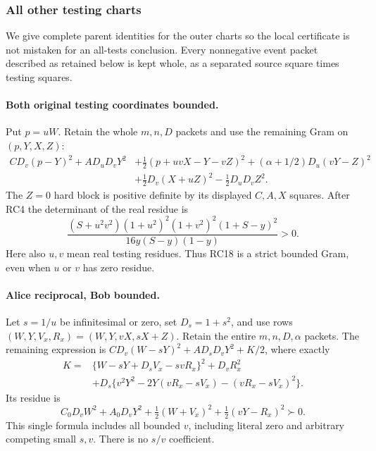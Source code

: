 \subsubsection*{All other testing charts}

We give complete parent identities for the outer charts so the
local certificate is not mistaken for an all-tests conclusion.
Every nonnegative event packet described as retained below is
kept whole, as a separated source square times testing squares.

\paragraph{Both original testing coordinates bounded.}
Put $p=uW$. Retain the whole $m,n,D$ packets and use the
remaining Gram on $(p,Y,X,Z)$:
\[
\begin{split}
 C D_v(p-Y)^2+A D_uD_vY^2
 &+\tfrac12(p+uvX-Y-vZ)^2+(\alpha+1/2)D_u(vY-Z)^2\\
 &+\tfrac12D_v(X+uZ)^2-\tfrac12D_uD_vZ^2.
\end{split}\tag{RC18}
\]
The $Z=0$ hard block is positive definite by its displayed
$C,A,X$ squares. After RC4 the determinant of the real residue is
\[
 \frac{(S+u^2v^2)(1+u^2)^2(1+v^2)^2(1+S-y)^2}
      {16y(S-y)(1-y)}>0.
 \tag{RC19}
\]
Here also $u,v$ mean real testing residues. Thus RC18 is a strict
bounded Gram, even when $u$ or $v$ has zero residue.

\paragraph{Alice reciprocal, Bob bounded.}
Let $s=1/u$ be infinitesimal or zero, set $D_s=1+s^2$, and use
rows $(W,Y,V_x,R_x)=(W,Y,vX,sX+Z)$. Retain the entire
$m,n,D,\alpha$ packets. The remaining expression is
$CD_v(W-sY)^2+AD_sD_vY^2+K/2$, where exactly
\[
\begin{split}
 K={}&\{W-sY+D_sV_x-svR_x\}^2+D_vR_x^2\\
 &+D_s\{v^2Y^2-2Y(vR_x-sV_x)-(vR_x-sV_x)^2\}.
\end{split}\tag{RC20}
\]
Its residue is
\[
 C_0D_vW^2+A_0D_vY^2
          +\tfrac12(W+V_x)^2+\tfrac12(vY-R_x)^2\succ0.
 \tag{RC21}
\]
This single formula includes all bounded $v$, including literal
zero and arbitrary competing small $s,v$. There is no $s/v$
coefficient.

